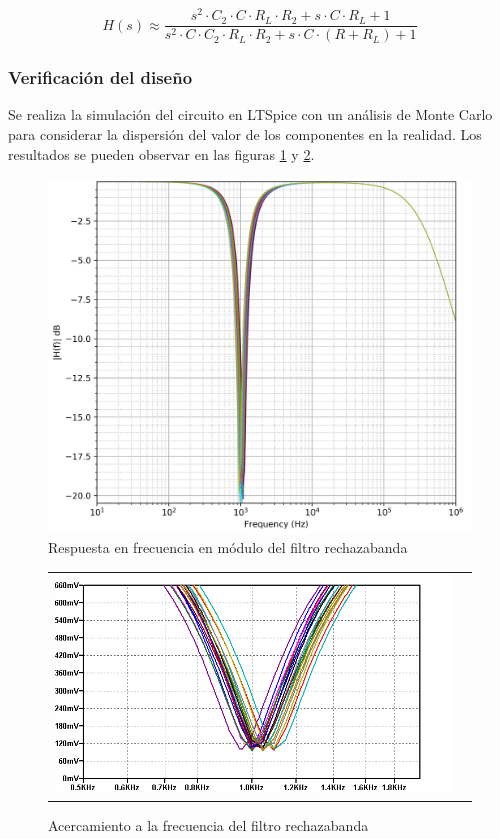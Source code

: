 \begin{equation}
    H(s) \approx \frac{s^{2} \cdot C_2 \cdot C \cdot R_L \cdot R_2 + s \cdot C \cdot R_L + 1}{s^{2} \cdot C \cdot C_2 \cdot R_L \cdot R_2 + s \cdot C \cdot (R + R_L) + 1}
\end{equation}

\subsubsection{Verificaci\'on del dise\~no}
Se realiza la simulaci\'on del circuito en LTSpice con un an\'alisis de Monte Carlo para considerar la dispersi\'on del valor de los componentes en la realidad.
Los resultados se pueden observar en las figuras \ref{fig:br_montecarlo} y \ref{fig:br_montecarlo_frecuencia}.

\begin{figure}[H]
    \centering
        \includegraphics[scale=0.12]{../EJ2/Recursos/br_montecarlo.png}
    \caption{Respuesta en frecuencia en m\'odulo del filtro rechazabanda}
    \label{fig:br_montecarlo}
\end{figure}

\begin{figure}[H]
    \centering
    \begin{tabular}{c c}
        \includegraphics[scale=0.6]{../EJ2/Recursos/br_montecarlo_frecuencia.png}
    \end{tabular}
    \caption{Acercamiento a la frecuencia del filtro rechazabanda}
    \label{fig:br_montecarlo_frecuencia}
\end{figure}

